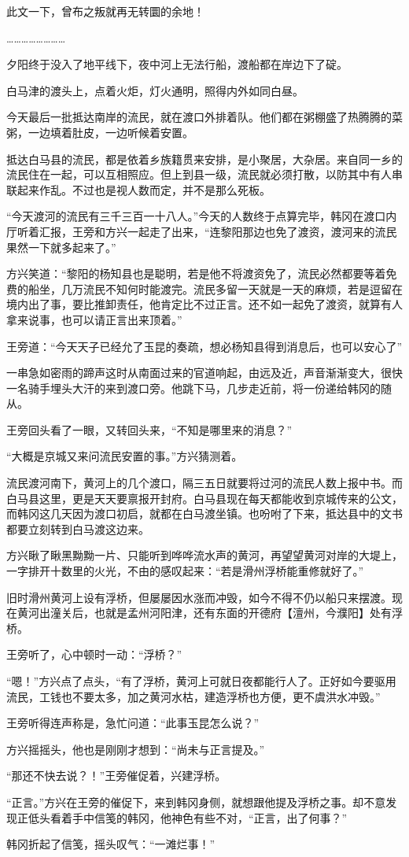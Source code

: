 此文一下，曾布之叛就再无转圜的余地！

……………………

夕阳终于没入了地平线下，夜中河上无法行船，渡船都在岸边下了碇。

白马津的渡头上，点着火炬，灯火通明，照得内外如同白昼。

今天最后一批抵达南岸的流民，就在渡口外排着队。他们都在粥棚盛了热腾腾的菜粥，一边填着肚皮，一边听候着安置。

抵达白马县的流民，都是依着乡族籍贯来安排，是小聚居，大杂居。来自同一乡的流民住在一起，可以互相照应。但上到县一级，流民就必须打散，以防其中有人串联起来作乱。不过也是视人数而定，并不是那么死板。

“今天渡河的流民有三千三百一十八人。”今天的人数终于点算完毕，韩冈在渡口内厅听着汇报，王旁和方兴一起走了出来，“连黎阳那边也免了渡资，渡河来的流民果然一下就多起来了。”

方兴笑道：“黎阳的杨知县也是聪明，若是他不将渡资免了，流民必然都要等着免费的船坐，几万流民不知何时能渡完。流民多留一天就是一天的麻烦，若是逗留在境内出了事，要比推卸责任，他肯定比不过正言。还不如一起免了渡资，就算有人拿来说事，也可以请正言出来顶着。”

王旁道：“今天天子已经允了玉昆的奏疏，想必杨知县得到消息后，也可以安心了”

一串急如密雨的蹄声这时从南面过来的官道响起，由远及近，声音渐渐变大，很快一名骑手埋头大汗的来到渡口旁。他跳下马，几步走近前，将一份递给韩冈的随从。

王旁回头看了一眼，又转回头来，“不知是哪里来的消息？”

“大概是京城又来问流民安置的事。”方兴猜测着。

流民渡河南下，黄河上的几个渡口，隔三五日就要将过河的流民人数上报中书。而白马县这里，更是天天要禀报开封府。白马县现在每天都能收到京城传来的公文，而韩冈这几天因为渡口初启，就都在白马渡坐镇。也吩咐了下来，抵达县中的文书都要立刻转到白马渡这边来。

方兴瞅了瞅黑黝黝一片、只能听到哗哗流水声的黄河，再望望黄河对岸的大堤上，一字排开十数里的火光，不由的感叹起来：“若是滑州浮桥能重修就好了。”

旧时滑州黄河上设有浮桥，但屡屡因水涨而冲毁，如今不得不仍以船只来摆渡。现在黄河出潼关后，也就是孟州河阳津，还有东面的开德府【澶州，今濮阳】处有浮桥。

王旁听了，心中顿时一动：“浮桥？”

“嗯！”方兴点了点头，“有了浮桥，黄河上可就日夜都能行人了。正好如今要驱用流民，工钱也不要太多，加之黄河水枯，建造浮桥也方便，更不虞洪水冲毁。”

王旁听得连声称是，急忙问道：“此事玉昆怎么说？”

方兴摇摇头，他也是刚刚才想到：“尚未与正言提及。”

“那还不快去说？！”王旁催促着，兴建浮桥。

“正言。”方兴在王旁的催促下，来到韩冈身侧，就想跟他提及浮桥之事。却不意发现正低头看着手中信笺的韩冈，他神色有些不对，“正言，出了何事？”

韩冈折起了信笺，摇头叹气：“一滩烂事！”

